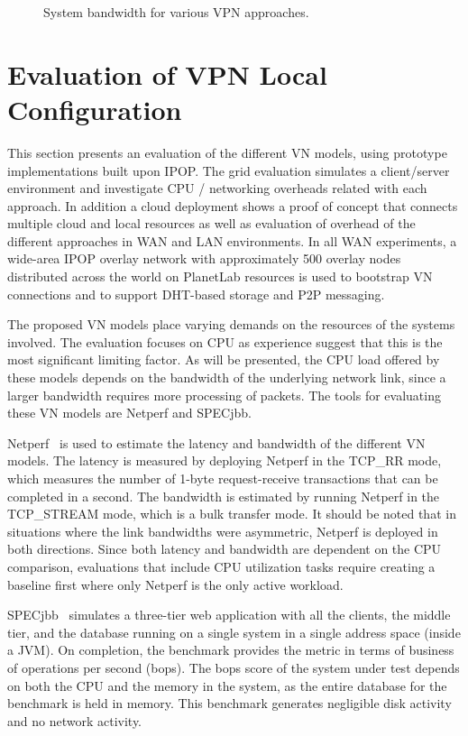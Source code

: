\begin{figure}
\centering
{}
\caption{System bandwidth for various VPN approaches.}
\label{fig:bandwidth}
\end{figure}

\section{Evaluation of VPN Local Configuration}

This section presents an evaluation of the different VN models, using prototype
implementations built upon IPOP.  The grid evaluation simulates a client/server
environment and investigate CPU / networking overheads related with each
approach.  In addition a cloud deployment shows a proof of concept that
connects multiple cloud and local resources as well as evaluation of overhead
of the different approaches in WAN and LAN environments.  In all WAN
experiments, a wide-area IPOP overlay network with approximately 500 overlay
nodes distributed across the world on PlanetLab resources is used to bootstrap
VN connections and to support DHT-based storage and P2P messaging.

The proposed VN models place varying demands on the resources of the systems
involved. The evaluation focuses on CPU as experience suggest that this is the
most significant limiting factor.  As will be presented, the CPU load offered
by these models depends on the bandwidth of the underlying network link, since
a larger bandwidth requires more processing of packets.  The tools for
evaluating these VN models are Netperf and SPECjbb.

Netperf~\cite{netperf} is used to estimate the latency and bandwidth of the
different VN models. The latency is measured by deploying Netperf in the
TCP\_RR mode, which measures the number of 1-byte request-receive transactions
that can be completed in a second. The bandwidth is estimated by running Netperf
in the TCP\_STREAM mode, which is a bulk transfer mode. It should be noted that
in situations where the link bandwidths were asymmetric, Netperf is deployed in
both directions.  Since both latency and bandwidth are dependent on the CPU
comparison, evaluations that include CPU utilization tasks require creating
a baseline first where only Netperf is the only active workload.

SPECjbb~\cite{specjbb} simulates a three-tier web application with all the
clients, the middle tier, and the database running on a single system in a
single address space (inside a JVM). On completion, the benchmark provides the
metric in terms of business of operations per second (bops). The bops score of
the system under test depends on both the CPU and the memory in the system, as
the entire database for the benchmark is held in memory. This benchmark
generates negligible disk activity and no network activity. 

